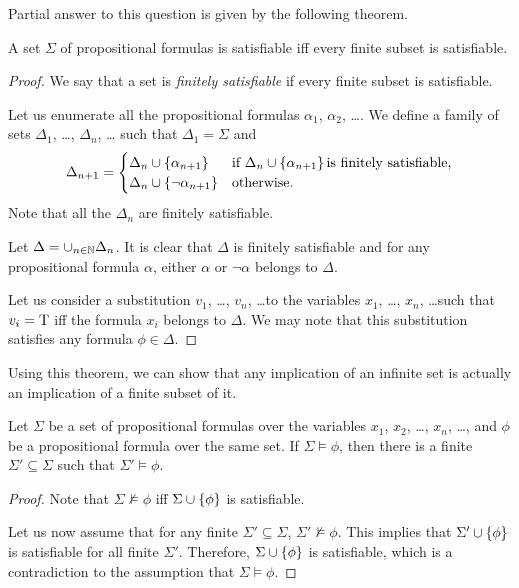 Partial answer to this question is given by the following theorem.
\begin{theorem}
  A set $\Sigma$ of propositional formulas is satisfiable iff every finite
  subset is satisfiable.
\end{theorem}
\begin{proof}
  We say that a set is \emph{finitely satisfiable} if every finite subset
  is satisfiable.


  Let us enumerate all the propositional formulas $\alpha_1$, $\alpha_2$, \dots.
  We define a family of sets $\Delta_1$, \dots, $\Delta_n$, \dots
  such that $\Delta_1 = \Sigma$ and
  \[
    \Delta_{n + 1} =
    \begin{cases}
      \Delta_n \cup \set{\alpha_{n + 1}} & \text{if }
        \Delta_n \cup \set{\alpha_{n + 1}} \text{is finitely satisfiable,} \\
      \Delta_n \cup \set{\lnot \alpha_{n + 1}} & \text{otherwise.}
    \end{cases}
  \]
  Note that all the $\Delta_n$ are finitely satisfiable.

  Let $\Delta = \cup_{n \in {\mathbb{N}}} \Delta_n$. It is clear that $\Delta$ is
  finitely satisfiable and for any propositional formula $\alpha$,
  either $\alpha$ or $\lnot \alpha$ belongs to $\Delta$.

  Let us consider a substitution $v_1$, \dots, $v_n$, \dots to the variables
  $x_1$, \dots, $x_n$, \dots such that $v_i = \text{T}$ iff the formula $x_i$
  belongs to $\Delta$. We may note that this substitution satisfies any
  formula $\phi \in \Delta$.
\end{proof}

Using this theorem, we can show that any implication of an infinite set is
actually an implication of a finite subset of it.
\begin{corollary}
  Let $\Sigma$ be a set of propositional formulas over the variables
  $x_1$, $x_2$, \dots, $x_n$, \dots, and $\phi$ be a propositional formula
  over the same set. If $\Sigma \models \phi$, then there is a finite
  $\Sigma' \subseteq \Sigma$ such that $\Sigma' \models \phi$.
\end{corollary}
\begin{proof}
  Note that $\Sigma \not\models \phi$ iff $\Sigma \cup \set{\phi}$ is
  satisfiable.

  Let us now assume that for any finite $\Sigma' \subseteq \Sigma$,
  $\Sigma' \not\models \phi$. This implies that $\Sigma' \cup \set{\phi}$
  is satisfiable for all finite $\Sigma'$. Therefore, $\Sigma \cup \set{\phi}$
  is satisfiable, which is a contradiction to the assumption that
  $\Sigma \models \phi$.
\end{proof}

